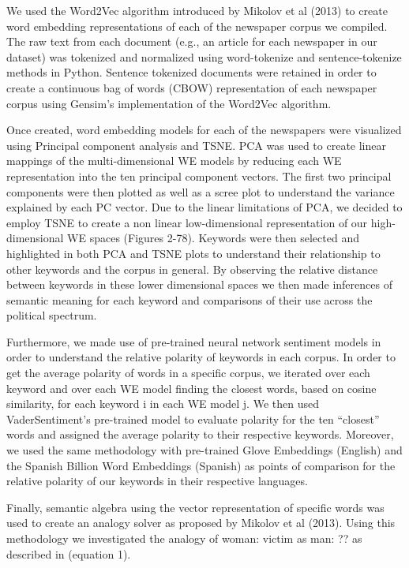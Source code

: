 \documentclass{article}
\begin{document}
{{We used the Word2Vec algorithm introduced by Mikolov et al (2013) to create word embedding representations of each of the newspaper corpus we compiled. The raw text from each document (e.g., an article for each newspaper in our dataset) was tokenized
and normalized using word-tokenize and sentence-tokenize methods in Python. Sentence tokenized documents were retained in order to create a continuous bag of words (CBOW) representation of each newspaper corpus using Gensim’s implementation of the Word2Vec algorithm.

Once created, word embedding models for each of the newspapers were visualized using Principal component analysis and TSNE. PCA was used to create linear mappings of the multi-dimensional WE models by reducing each WE representation into the ten principal component vectors. The first two principal components were then plotted as well as a scree plot to understand the variance explained by each PC vector. Due to the linear limitations of PCA, we decided to employ TSNE to create a non linear low-dimensional representation of our high-dimensional WE spaces (Figures 2-78). Keywords were then selected and highlighted in both PCA and TSNE plots to understand their relationship to other keywords and the corpus in general. By observing the relative distance between keywords in these lower dimensional spaces we then made inferences of semantic meaning for each keyword and comparisons of their use across the political spectrum.

Furthermore, we made use of pre-trained neural network sentiment models in order to understand the relative polarity of keywords in each corpus. In order to get the average polarity of words in a specific corpus, we iterated over each keyword and over each WE model finding the closest words,  based on cosine similarity, for each keyword i in each WE model j. We then used VaderSentiment’s pre-trained model to evaluate polarity for the ten “closest” words and assigned the average polarity to their respective keywords. Moreover, we used the same methodology with pre-trained Glove Embeddings (English) and the Spanish Billion Word Embeddings (Spanish) as points of comparison for the relative polarity of our keywords in their respective languages. 

Finally, semantic algebra using the vector representation of specific words was used to create an analogy solver as proposed by Mikolov et al (2013). Using this methodology we investigated the analogy of woman: victim as man: ?? as described in (equation 1). 

}}
\end{document}
